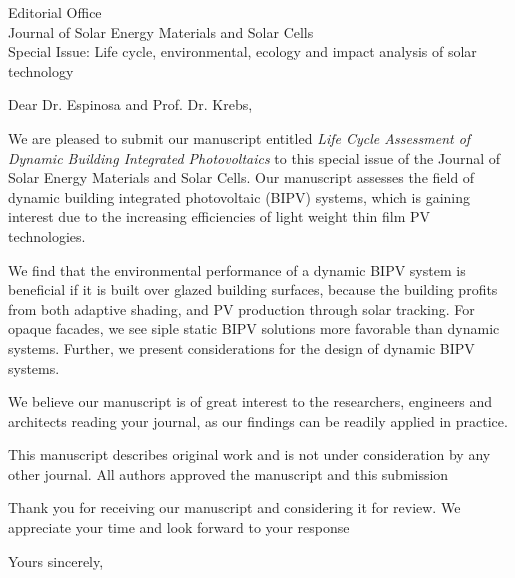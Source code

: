 \documentclass[a4paper,12pt]{letter}
\begin{document}
\begin{letter}{Editorial Office \\ Journal of Solar Energy Materials and Solar Cells\\ Special Issue: Life cycle, environmental, ecology and impact analysis of solar technology}

	\opening{Dear Dr. Espinosa and Prof. Dr. Krebs,}
	We are pleased to submit our manuscript entitled \emph{Life Cycle Assessment of Dynamic Building Integrated Photovoltaics} to this special issue of the Journal of Solar Energy Materials and Solar Cells. 
	Our manuscript assesses the field of dynamic building integrated photovoltaic (BIPV) systems, which is gaining interest due to the increasing efficiencies of light weight thin film PV technologies. 




	We find that the environmental performance of a dynamic BIPV system is beneficial if it is built over glazed building surfaces, because the building profits from both adaptive shading, and PV production through solar tracking. For opaque facades, we see siple static BIPV solutions more favorable than dynamic systems. Further, we present considerations for the design of dynamic BIPV systems.
	
	We believe our manuscript is of great interest to the researchers, engineers and architects reading your journal, as our findings can be readily applied in practice.

	This manuscript describes original work and is not under consideration by any other journal. All authors approved the manuscript and this submission

	Thank you for receiving our manuscript and considering it for review. We appreciate your time and look forward to your response


	\signature{Prageeth Jayathissa}
	\closing{Yours sincerely,}
\end{letter}

	
\end{document}
